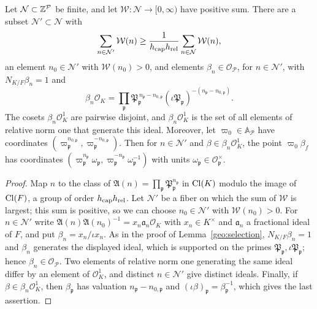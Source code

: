 \begin{lemma}\label{fw:selection}
Let $\mathcal N\subset\mathbb Z^{\mathcal P}$ be finite, and let
$\mathcal W\colon\mathcal N\to[0,\infty)$ have positive sum. There are a
subset $\mathcal N'\subset\mathcal N$ with
\[
 \sum_{n\in\mathcal N'}\mathcal W(n)\ge\frac1{h_{\rm cap}h_{\rm rel}}
 \sum_{n\in\mathcal N}\mathcal W(n),
\]
an element $n_0\in\mathcal N'$ with $\mathcal W(n_0)>0$, and elements
$\beta_n\in\mathcal O_{\mathcal P}$, for $n\in\mathcal N'$, with $N_{K/F}\beta_n=1$ and
\[
 \beta_n\mathcal O_K=\prod_{\mathfrak p}\mathfrak P_{\mathfrak
 p}^{\,n_{\mathfrak p}-n_{0,\mathfrak p}}
 (\iota\mathfrak P_{\mathfrak p})^{-(n_{\mathfrak p}-n_{0,\mathfrak p})}.
\]
The cosets $\beta_n\mathcal O_K^1$ are pairwise disjoint, and
$\beta_n\mathcal O_K^1$ is the set of all elements of relative norm one
that generate this ideal. Moreover, let $\varpi_0\in\mathbb A_{\mathcal
P}$ have coordinates $(\varpi_{\mathfrak p}^{n_{0,\mathfrak
p}},\varpi_{\mathfrak p}^{-n_{0,\mathfrak p}})$. Then for $n\in\mathcal
N'$ and $\beta\in\beta_n\mathcal O_K^1$, the point $\varpi_0\beta_f$ has
coordinates $(\varpi_{\mathfrak p}^{n_{\mathfrak p}}\omega_{\mathfrak
p},\varpi_{\mathfrak p}^{-n_{\mathfrak p}}\omega_{\mathfrak p}^{-1})$
with units $\omega_{\mathfrak p}\in\mathcal O_{\mathfrak p}^\times$.
\end{lemma}

\begin{proof}
Map $n$ to the class of $\mathfrak A(n)=\prod_{\mathfrak p}\mathfrak
P_{\mathfrak p}^{n_{\mathfrak p}}$ in $\operatorname{Cl}(K)$ modulo the image of
$\operatorname{Cl}(F)$, a group of order $h_{\rm cap}h_{\rm rel}$. Let $\mathcal N'$ be a
fiber on which the sum of $\mathcal W$ is largest; this sum is positive,
so we can choose $n_0\in\mathcal N'$ with $\mathcal W(n_0)>0$. For
$n\in\mathcal N'$ write $\mathfrak A(n)\mathfrak
A(n_0)^{-1}=x_n\mathfrak a_n\mathcal O_K$ with $x_n\in K^\times$ and
$\mathfrak a_n$ a fractional ideal of $F$, and put
$\beta_n=x_n/\iota x_n$. As in the proof of Lemma~\ref{geo:selection},
$N_{K/F}\beta_n=1$ and $\beta_n$ generates the displayed ideal, which
is supported on the primes $\mathfrak P_{\mathfrak p},\iota\mathfrak
P_{\mathfrak p}$; hence $\beta_n\in\mathcal O_{\mathcal P}$. Two elements of relative
norm one generating the same ideal differ by an element of $\mathcal
O_K^1$, and distinct $n\in\mathcal N'$ give distinct ideals. Finally, if
$\beta\in\beta_n\mathcal O_K^1$, then $\beta_{\mathfrak p}$ has
valuation $n_{\mathfrak p}-n_{0,\mathfrak p}$ and $(\iota\beta)_{\mathfrak
p}=\beta_{\mathfrak p}^{-1}$, which gives the last assertion.
\end{proof}

